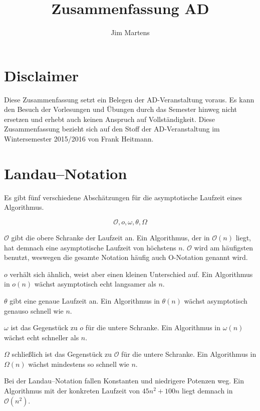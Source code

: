 \documentclass[10pt,a4paper,oneside,ngerman,numbers=noenddot]{scrartcl}
\begin{document}
\author{Jim Martens}
\title{Zusammenfassung AD}
\maketitle

\section*{Disclaimer}

	Diese Zusammenfassung setzt ein Belegen der AD-Veranstaltung voraus. Es kann den Besuch der Vorlesungen und Übungen durch das Semester hinweg nicht ersetzen und erhebt auch keinen Anspruch auf Vollständigkeit. Diese Zusammenfassung bezieht sich auf den Stoff der AD-Veranstaltung im Wintersemester 2015/2016 von Frank Heitmann.

\tableofcontents

\clearpage

\section{Landau--Notation}

	Es gibt fünf verschiedene Abschätzungen für die asymptotische Laufzeit eines Algorithmus.
	
	\[
		\mathcal{O}, o, \omega, \theta, \Omega
	\]
	
	$\mathcal{O}$ gibt die obere Schranke der Laufzeit an. Ein Algorithmus, der in $\mathcal{O}(n)$ liegt, hat demnach eine asymptotische Laufzeit von höchstens $n$. $\mathcal{O}$ wird am häufigsten benutzt, weswegen die gesamte Notation häufig auch O-Notation genannt wird.
	
	$o$ verhält sich ähnlich, weist aber einen kleinen Unterschied auf. Ein Algorithmus in $o(n)$ wächst asymptotisch echt langsamer als $n$.
	
	$\theta$ gibt eine genaue Laufzeit an. Ein Algorithmus in $\theta(n)$ wächst asymptotisch genauso schnell wie $n$.
	
	$\omega$ ist das Gegenstück zu $o$ für die untere Schranke. Ein Algorithmus in $\omega(n)$ wächst echt schneller als $n$.
	
	$\Omega$ schließlich ist das Gegenstück zu $\mathcal{O}$ für die untere Schranke. Ein Algorithmus in $\Omega(n)$ wächst mindestens so schnell wie $n$.
	
	Bei der Landau--Notation fallen Konstanten und niedrigere Potenzen weg. Ein Algorithmus mit der konkreten Laufzeit von $45n^{2} + 100n$ liegt demnach in $\mathcal{O}(n^{2})$.
	
\end{document}
